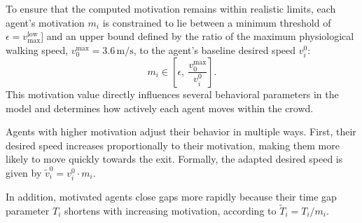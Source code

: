 \documentclass[pdflatex,sn-mathphys-num]{sn-jnl}%
\theoremstyle{thmstyleone}%
\theoremstyle{thmstyletwo}%
\theoremstyle{thmstylethree}%
\begin{document}








To ensure that the computed motivation remains within realistic limits, each agent's motivation \( m_i \) is constrained to lie between a minimum threshold of $\epsilon=v_{\max}^{\text{low}}]$ and an upper bound defined by the ratio of the maximum physiological walking speed, \( v_0^{\text{max}} = 3.6\, \text{m/s} \), to the agent's baseline desired speed \( v_i^0 \):
\[
m_i \in \left[\epsilon,\ \frac{v_0^{\text{max}}}{v_i^0}\right].
\]
This motivation value directly influences several behavioral parameters in the model and determines how actively each agent moves within the crowd. 

Agents with higher motivation adjust their behavior in multiple ways. First, their desired speed increases proportionally to their motivation, making them more likely to move quickly towards the exit. Formally, the adapted desired speed is given by \( \tilde{v}_i^0 = v_i^0 \cdot m_i \). 



In addition, motivated agents close gaps more rapidly because their time gap parameter \( T_i \) shortens with increasing motivation, according to \( \tilde{T}_i = T_i / m_i \).
\end{document}
